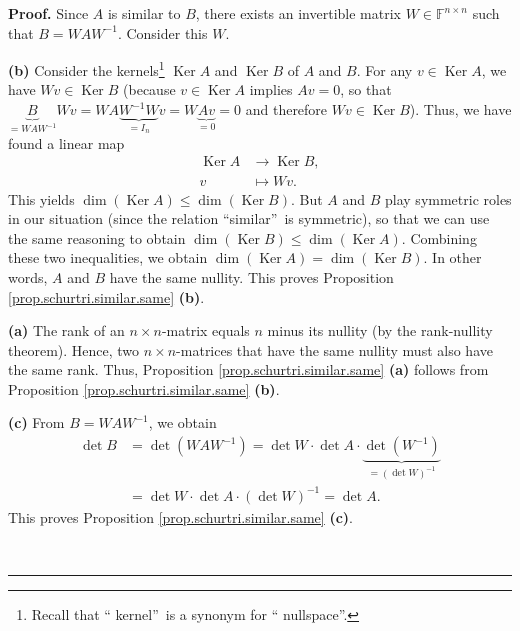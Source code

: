 \documentclass[numbers=enddot,12pt,final,onecolumn,notitlepage]{scrartcl}%
\numberwithin{exer}{subsection}
\theoremstyle{definition}
\newenvironment{proof}[1][Proof]{\noindent\textbf{#1.} }{\ \rule{0.5em}{0.5em}}
\begin{document}
\begin{proof}
Since $A$ is similar to $B$, there exists an invertible matrix $W\in
\mathbb{F}^{n\times n}$ such that $B=WAW^{-1}$. Consider this $W$.

\textbf{(b)} Consider the kernels\footnote{Recall that \textquotedblleft
kernel\textquotedblright\ is a synonym for \textquotedblleft
nullspace\textquotedblright.} $\operatorname*{Ker}A$ and $\operatorname*{Ker}%
B$ of $A$ and $B$. For any $v\in\operatorname*{Ker}A$, we have $Wv\in
\operatorname*{Ker}B$ (because $v\in\operatorname*{Ker}A$ implies $Av=0$, so
that $\underbrace{B}_{=WAW^{-1}}Wv=WA\underbrace{W^{-1}W}_{=I_{n}%
}v=W\underbrace{Av}_{=0}=0$ and therefore $Wv\in\operatorname*{Ker}B$). Thus,
we have found a linear map%
\begin{align*}
\operatorname*{Ker}A  &  \rightarrow\operatorname*{Ker}B,\\
v  &  \mapsto Wv.
\end{align*}
This yields $\dim\left(  \operatorname*{Ker}A\right)  \leq\dim\left(
\operatorname*{Ker}B\right)  $. But $A$ and $B$ play symmetric roles in our
situation (since the relation \textquotedblleft similar\textquotedblright\ is
symmetric), so that we can use the same reasoning to obtain $\dim\left(
\operatorname*{Ker}B\right)  \leq\dim\left(  \operatorname*{Ker}A\right)  $.
Combining these two inequalities, we obtain $\dim\left(  \operatorname*{Ker}%
A\right)  =\dim\left(  \operatorname*{Ker}B\right)  $. In other words, $A$ and
$B$ have the same nullity. This proves Proposition
\ref{prop.schurtri.similar.same} \textbf{(b)}.

\textbf{(a)} The rank of an $n\times n$-matrix equals $n$ minus its nullity
(by the rank-nullity theorem). Hence, two $n\times n$-matrices that have the
same nullity must also have the same rank. Thus, Proposition
\ref{prop.schurtri.similar.same} \textbf{(a)} follows from Proposition
\ref{prop.schurtri.similar.same} \textbf{(b)}.

\textbf{(c)} From $B=WAW^{-1}$, we obtain%
\begin{align*}
\det B  &  =\det\left(  WAW^{-1}\right)  =\det W\cdot\det A\cdot
\underbrace{\det\left(  W^{-1}\right)  }_{=\left(  \det W\right)  ^{-1}}\\
&  =\det W\cdot\det A\cdot\left(  \det W\right)  ^{-1}=\det A.
\end{align*}
This proves Proposition \ref{prop.schurtri.similar.same} \textbf{(c)}.


\end{proof}
\end{document}
